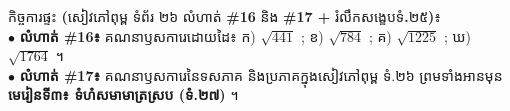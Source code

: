 \documentclass[a4paper,10pt]{article}
\newcommand{\enbf}[1]{{\TimesEn\bfseries #1}}
\begin{document}
\vspace{5pt}
\begin{tcolorbox}[enhanced, sharp corners, colback=panelgray, colframe=black, boxrule=0.85pt, boxsep=2.5pt, top=3.5pt, bottom=3.5pt, left=5pt, right=5pt]
  {\muol\fontsize{8.8pt}{12.5pt}\selectfont កិច្ចការផ្ទះ \enbf{(}សៀវភៅពុម្ព ទំព័រ ២៦ លំហាត់ \enbf{\#16} និង \enbf{\#17 +} រំលឹកសង្ខេបទំ\enbf{.}២៥\enbf{)}៖}\\[2pt]
  $\bullet$ \textbf{លំហាត់ \#16៖} គណនាឫសការេដោយដៃ៖ ក) $\sqrt{441}$ ; ខ) $\sqrt{784}$ ; គ) $\sqrt{1225}$ ; ឃ) $\sqrt{1764}$ ។\\
  $\bullet$ \textbf{លំហាត់ \#17៖} គណនាឫសការេនៃទសភាគ និងប្រភាគក្នុងសៀវភៅពុម្ព ទំ.២៦ ព្រមទាំងអានមុន \textbf{មេរៀនទី៣៖ ទំហំសមាមាត្រស្រប (ទំ.២៧)} ។
\end{tcolorbox}
\end{document}
